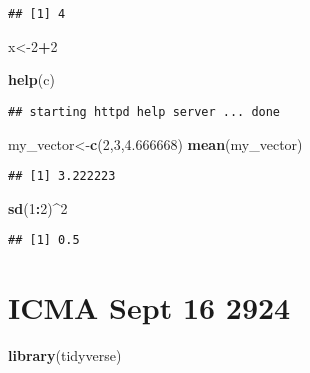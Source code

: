 \documentclass[
]{article}
\newenvironment{Shaded}{\begin{snugshade}}{\end{snugshade}}
\newcommand{\DecValTok}[1]{\textcolor[rgb]{0.00,0.00,0.81}{#1}}
\newcommand{\FloatTok}[1]{\textcolor[rgb]{0.00,0.00,0.81}{#1}}
\newcommand{\FunctionTok}[1]{\textcolor[rgb]{0.13,0.29,0.53}{\textbf{#1}}}
\newcommand{\NormalTok}[1]{#1}
\newcommand{\OtherTok}[1]{\textcolor[rgb]{0.56,0.35,0.01}{#1}}
\newcommand{\SpecialCharTok}[1]{\textcolor[rgb]{0.81,0.36,0.00}{\textbf{#1}}}
\begin{document}
\begin{verbatim}
## [1] 4
\end{verbatim}

\begin{Shaded}
\begin{Highlighting}[]
\NormalTok{x}\OtherTok{\textless{}{-}}\DecValTok{2}\SpecialCharTok{+}\DecValTok{2}
\end{Highlighting}
\end{Shaded}

\begin{Shaded}
\begin{Highlighting}[]
\FunctionTok{help}\NormalTok{(c)}
\end{Highlighting}
\end{Shaded}

\begin{verbatim}
## starting httpd help server ... done
\end{verbatim}

\begin{Shaded}
\begin{Highlighting}[]
\NormalTok{my\_vector}\OtherTok{\textless{}{-}}\FunctionTok{c}\NormalTok{(}\DecValTok{2}\NormalTok{,}\DecValTok{3}\NormalTok{,}\FloatTok{4.666668}\NormalTok{)}
\FunctionTok{mean}\NormalTok{(my\_vector)}
\end{Highlighting}
\end{Shaded}

\begin{verbatim}
## [1] 3.222223
\end{verbatim}

\begin{Shaded}
\begin{Highlighting}[]
\FunctionTok{sd}\NormalTok{(}\DecValTok{1}\SpecialCharTok{:}\DecValTok{2}\NormalTok{)}\SpecialCharTok{\^{}}\DecValTok{2}
\end{Highlighting}
\end{Shaded}

\begin{verbatim}
## [1] 0.5
\end{verbatim}

\section{ICMA Sept 16 2924}\label{icma-sept-16-2924}

\begin{Shaded}
\begin{Highlighting}[]
\FunctionTok{library}\NormalTok{(tidyverse)}
\end{Highlighting}
\end{Shaded}
\end{document}
